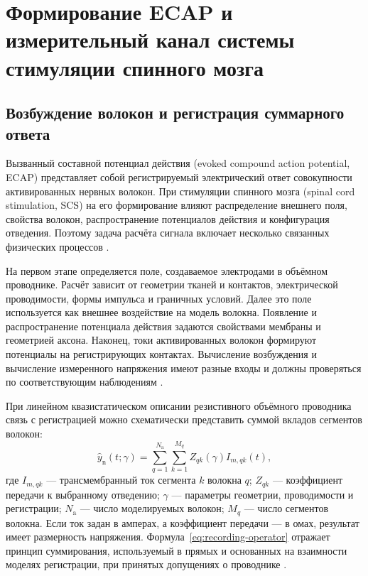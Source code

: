 \section{Формирование ECAP и измерительный канал системы стимуляции спинного мозга}
\label{sec:ecap-channel}

\subsection{Возбуждение волокон и регистрация суммарного ответа}

Вызванный составной потенциал действия (evoked compound action potential, ECAP) представляет собой регистрируемый электрический ответ совокупности активированных нервных волокон. При стимуляции спинного мозга (spinal cord stimulation, SCS) на его формирование влияют распределение внешнего поля, свойства волокон, распространение потенциалов действия и конфигурация отведения. Поэтому задача расчёта сигнала включает несколько связанных физических процессов \cite{ecapmodel,s285}.

На первом этапе определяется поле, создаваемое электродами в объёмном проводнике. Расчёт зависит от геометрии тканей и контактов, электрической проводимости, формы импульса и граничных условий. Далее это поле используется как внешнее воздействие на модель волокна. Появление и распространение потенциала действия задаются свойствами мембраны и геометрией аксона. Наконец, токи активированных волокон формируют потенциалы на регистрирующих контактах. Вычисление возбуждения и вычисление измеренного напряжения имеют разные входы и должны проверяться по соответствующим наблюдениям \cite{ecapmodel,posture}.

При линейном квазистатическом описании резистивного объёмного проводника связь с регистрацией можно схематически представить суммой вкладов сегментов волокон:
\begin{equation}
 \widehat y_{\mathrm n}(t;\gamma)=
 \sum_{q=1}^{N_{\mathrm a}}\sum_{k=1}^{M_q}
 Z_{qk}(\gamma) I_{m,qk}(t),
 \label{eq:recording-operator}
\end{equation}
где $I_{m,qk}$ --- трансмембранный ток сегмента $k$ волокна $q$; $Z_{qk}$ --- коэффициент передачи к выбранному отведению; $\gamma$ --- параметры геометрии, проводимости и регистрации; $N_{\mathrm a}$ --- число моделируемых волокон; $M_q$ --- число сегментов волокна. Если ток задан в амперах, а коэффициент передачи --- в омах, результат имеет размерность напряжения. Формула~\eqref{eq:recording-operator} отражает принцип суммирования, используемый в прямых и основанных на взаимности моделях регистрации, при принятых допущениях о проводнике \cite{ecapmodel,posture}.

